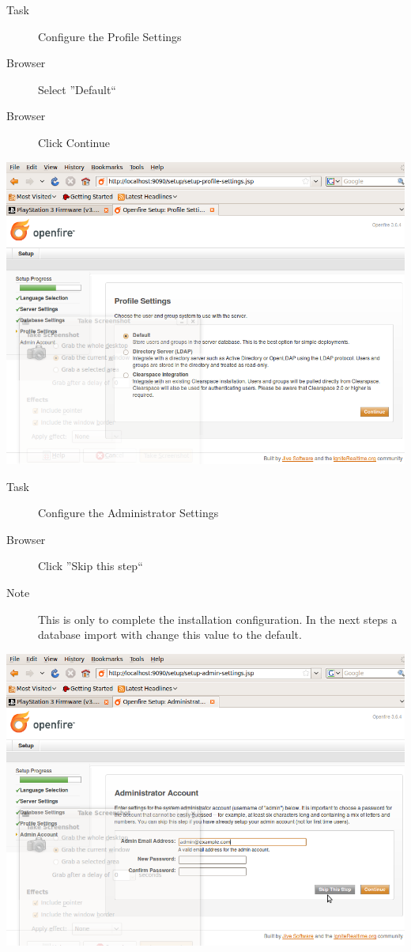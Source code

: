 \begin{description}
\item [Task] Configure the Profile Settings
\item [Browser] Select ''Default``
\item [Browser] Click Continue
\end{description}
\begin{center}
\includegraphics[scale=0.5]{figs/deploy/openfire-5.png} 
\end{center}

\begin{description}
\item [Task] Configure the Administrator Settings
\item [Browser] Click ''Skip this step``
\item [Note] This is only to complete the installation configuration. In the next steps
a database import with change this value to the default.
\end{description}
\begin{center}
\includegraphics[scale=0.5]{figs/deploy/openfire-6.png} 
\end{center}

